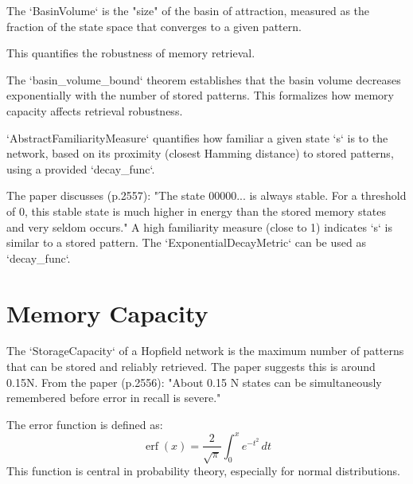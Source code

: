 \begin{definition}\label{BasinVolume}
\leanok
The `BasinVolume` is the "size" of the basin of attraction, measured as the
fraction of the state space that converges to a given pattern.

This quantifies the robustness of memory retrieval.
\end{definition}

\begin{theorem}\label{basin_volume_bound}
\leanok
The `basin\_volume\_bound` theorem establishes that the basin volume decreases
exponentially with the number of stored patterns.
This formalizes how memory capacity affects retrieval robustness.
\end{theorem}

\begin{definition}\label{AbstractFamiliarityMeasure}
\leanok
`AbstractFamiliarityMeasure` quantifies how familiar a given state `s` is to the network,
based on its proximity (closest Hamming distance) to stored patterns, using a provided `decay\_func`.

The paper discusses (p.2557): "The state 00000... is always stable. For a threshold of 0, this
stable state is much higher in energy than the stored memory states and very seldom occurs."
A high familiarity measure (close to 1) indicates `s` is similar to a stored pattern.
The `ExponentialDecayMetric` can be used as `decay\_func`.
\end{definition}


\section{Memory Capacity}

\begin{definition}\label{StorageCapacity}
\leanok
The `StorageCapacity` of a Hopfield network is the maximum number of patterns
that can be stored and reliably retrieved. The paper suggests this is around 0.15N.
From the paper (p.2556): "About 0.15 N states can be simultaneously remembered before
error in recall is severe."
\end{definition}

\begin{definition}\label{Hopfield82.Real.erf}
\leanok
The error function is defined as:
  \[
\operatorname{erf}(x) = \frac{2}{\sqrt{\pi}} \int_0^x e^{-t^2} \, dt
\]
This function is central in probability theory, especially for normal distributions.
\end{definition}

